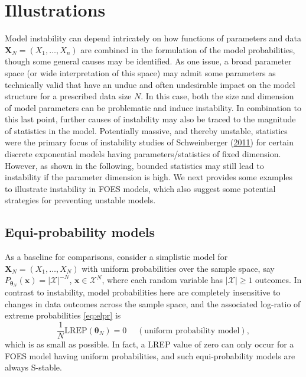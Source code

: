 \documentclass[12pt]{article}
\theoremstyle{definition}
\newcommand{\REP}{\mathrm{LREP}}
\begin{document}
\section{Illustrations}\label{illustrations}

Model instability can depend intricately on how functions of parameters
and data \(\boldsymbol X_N=(X_1,\ldots,X_n)\) are combined in the
formulation of the model probabilities, though some general causes may
be identified. As one issue, a broad parameter space (or wide
interpretation of this space) may admit some parameters as technically
valid that have an undue and often undesirable impact on the model
structure for a prescribed data size \(N\). In this case, both the size
and dimension of model parameters can be problematic and induce
instability. In combination to this last point, further causes of
instability may also be traced to the magnitude of statistics in the
model. Potentially massive, and thereby unstable, statistics were the
primary focus of instability studies of Schweinberger
(\protect\hyperlink{ref-schweinberger2011instability}{2011}) for certain
discrete exponential models having parameters/statistics of fixed
dimension. However, as shown in the following, bounded statistics may
still lead to instability if the parameter dimension is high. We next
provides some examples to illustrate instability in FOES models, which
also suggest some potential strategies for preventing unstable models.

\subsection{Equi-probability models}\label{equi-probability-models}

As a baseline for comparisons, consider a simplistic model for
\(\boldsymbol X_N=(X_1,\ldots,X_N)\) with uniform probabilities over the
sample space, say
\(P_{\boldsymbol \theta_N}(\boldsymbol x)= |\mathcal{X}|^{-N}\),
\(\boldsymbol x \in \mathcal{X}^N\), where each random variable has
\(|\mathcal{X}| \geq 1\) outcomes. In contrast to instability, model
probabilities here are completely insensitive to changes in data
outcomes across the sample space, and the associated log-ratio of
extreme probabilities \eqref{eq:elpr} is \[
\frac{1}{N} \REP(\boldsymbol \theta_N)=0\quad \;(\mbox{uniform probability model}),
\] which is as small as possible. In fact, a LREP value of zero can only
occur for a FOES model having uniform probabilities, and such
equi-probability models are always S-stable.
\end{document}
